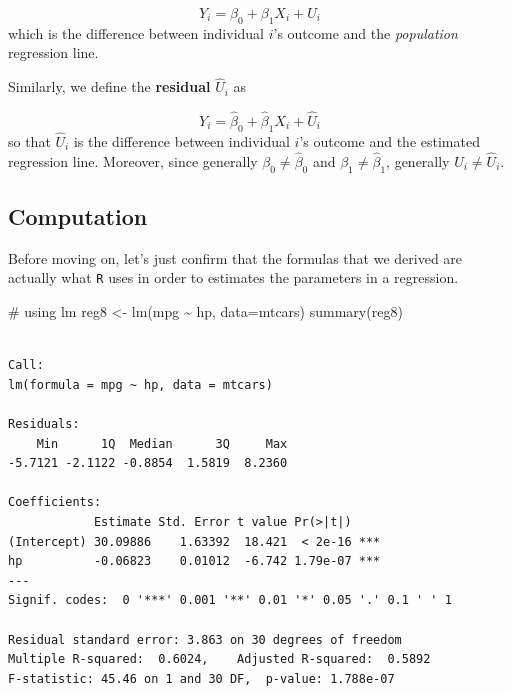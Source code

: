 \documentclass[
  letterpaper,
  DIV=11,
  numbers=noendperiod]{scrreprt}
\newenvironment{Shaded}{\begin{snugshade}}{\end{snugshade}}
\newcommand{\AttributeTok}[1]{\textcolor[rgb]{0.40,0.45,0.13}{#1}}
\newcommand{\CommentTok}[1]{\textcolor[rgb]{0.37,0.37,0.37}{#1}}
\newcommand{\FunctionTok}[1]{\textcolor[rgb]{0.28,0.35,0.67}{#1}}
\newcommand{\NormalTok}[1]{\textcolor[rgb]{0.00,0.23,0.31}{#1}}
\newcommand{\OtherTok}[1]{\textcolor[rgb]{0.00,0.23,0.31}{#1}}
\newcommand{\SpecialCharTok}[1]{\textcolor[rgb]{0.37,0.37,0.37}{#1}}
\begin{document}
\[
  Y_i = \beta_0 + \beta_1 X_i + U_i
\] which is the difference between individual \(i\)'s outcome and the
\emph{population} regression line.

Similarly, we define the \textbf{residual} \(\hat{U}_i\) as

\[
  Y_i = \hat{\beta}_0 + \hat{\beta}_1 X_i + \hat{U}_i
\] so that \(\hat{U}_i\) is the difference between individual \(i\)'s
outcome and the estimated regression line. Moreover, since generally
\(\beta_0 \neq \hat{\beta}_0\) and \(\beta_1 \neq \hat{\beta}_1\),
generally \(U_i \neq \hat{U}_i\).

\subsection{Computation}\label{computation-7}

Before moving on, let's just confirm that the formulas that we derived
are actually what \texttt{R} uses in order to estimates the parameters
in a regression.

\begin{Shaded}
\begin{Highlighting}[]
\CommentTok{\# using lm}
\NormalTok{reg8 }\OtherTok{\textless{}{-}} \FunctionTok{lm}\NormalTok{(mpg }\SpecialCharTok{\textasciitilde{}}\NormalTok{ hp, }\AttributeTok{data=}\NormalTok{mtcars)}
\FunctionTok{summary}\NormalTok{(reg8)}
\end{Highlighting}
\end{Shaded}

\begin{verbatim}

Call:
lm(formula = mpg ~ hp, data = mtcars)

Residuals:
    Min      1Q  Median      3Q     Max 
-5.7121 -2.1122 -0.8854  1.5819  8.2360 

Coefficients:
            Estimate Std. Error t value Pr(>|t|)    
(Intercept) 30.09886    1.63392  18.421  < 2e-16 ***
hp          -0.06823    0.01012  -6.742 1.79e-07 ***
---
Signif. codes:  0 '***' 0.001 '**' 0.01 '*' 0.05 '.' 0.1 ' ' 1

Residual standard error: 3.863 on 30 degrees of freedom
Multiple R-squared:  0.6024,    Adjusted R-squared:  0.5892 
F-statistic: 45.46 on 1 and 30 DF,  p-value: 1.788e-07
\end{verbatim}
\end{document}
